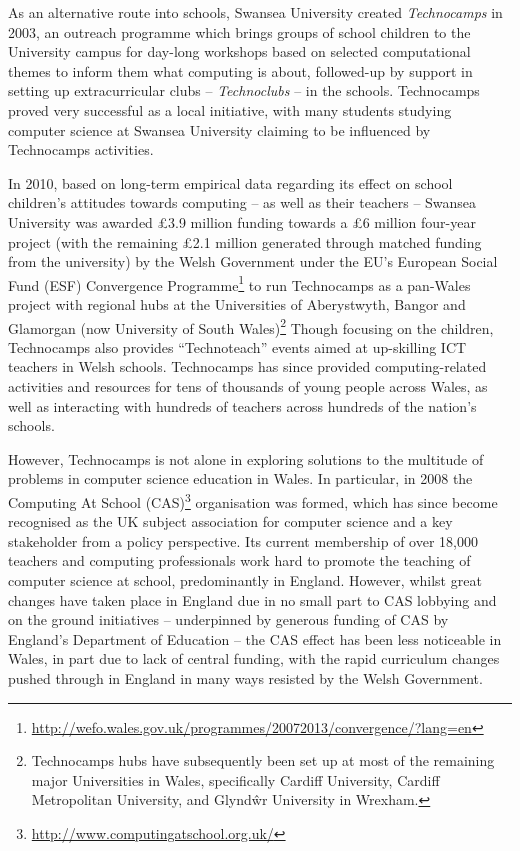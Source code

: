 \documentclass{sig-alternate}
\begin{document}
As an alternative route into schools, Swansea University created
\emph{Technocamps} in 2003, an outreach programme which brings groups
of school children to the University campus for day-long workshops based on
selected computational themes to inform them what computing is about,
followed-up by support in setting up
extracurricular clubs -- \emph{Technoclubs} -- in the schools.
Technocamps proved very successful as a local initiative, with many
students studying computer science at Swansea University claiming to be
influenced by Technocamps activities.

In 2010, based on long-term empirical data regarding its effect on
school children's attitudes towards computing -- as well as their
teachers -- Swansea University was awarded \pounds 3.9 million funding
towards a \pounds 6 million four-year project (with the remaining
\pounds 2.1 million generated through matched funding from the
university) by the Welsh Government under the EU's European Social
Fund (ESF) Convergence
Programme\footnote{\url{http://wefo.wales.gov.uk/programmes/20072013/convergence/?lang=en}}
to run Technocamps as a pan-Wales project with regional hubs at the
Universities of Aberystwyth, Bangor and Glamorgan (now University of
South Wales)\footnote{Technocamps hubs have subsequently been set up
at most of the remaining major Universities in Wales, specifically
Cardiff University, Cardiff Metropolitan University, and Glynd\^wr
University in Wrexham.}  Though focusing on the children, Technocamps
also provides ``Technoteach'' events aimed at up-skilling ICT teachers
in Welsh schools.  Technocamps has since provided computing-related
activities and resources for tens of thousands of young people across
Wales, as well as interacting with hundreds of teachers across
hundreds of the nation's schools.

However, Technocamps is not alone in exploring solutions to the
multitude of problems in computer science education in Wales.  In
particular, in 2008 the Computing At School
(CAS)\footnote{\url{http://www.computingatschool.org.uk/}}
organisation was formed, which has since become recognised as the UK
subject association for computer science and a key stakeholder from a
policy perspective. Its current membership of over 18,000 teachers and
computing professionals work hard to promote the teaching of computer
science at school, predominantly in England.  However, whilst great
changes have taken place in England due in no small part to CAS
lobbying and on the ground initiatives -- underpinned by generous
funding of CAS by England's Department of Education -- the CAS effect
has been less noticeable in Wales, in part due to lack of central
funding, with the rapid curriculum changes pushed through in England
in many ways resisted by the Welsh Government.
\end{document}

